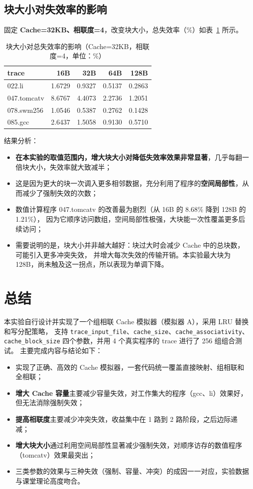 \documentclass[12pt,a4paper]{ctexart}
\begin{document}
\subsection{块大小对失效率的影响}
固定 \textbf{Cache=32KB、相联度=4}，改变块大小，总失效率（\%）如表~\ref{tab:block} 所示。
\begin{table}[H]
\centering
\caption{块大小对总失效率的影响（Cache=32KB，相联度=4，单位：\%）}
\label{tab:block}
\begin{tabular}{lrrrr}
\toprule
trace & 16B & 32B & 64B & 128B \\
\midrule
022.li      & 1.6729 & 0.9327 & 0.5137 & 0.2863 \\
047.tomcatv & 8.6767 & 4.4073 & 2.2736 & 1.2051 \\
078.swm256  & 1.0546 & 0.5387 & 0.2762 & 0.1428 \\
085.gcc     & 2.6437 & 1.5058 & 0.9130 & 0.5710 \\
\bottomrule
\end{tabular}
\end{table}
结果分析：
\begin{itemize}
  \item \textbf{在本实验的取值范围内，增大块大小对降低失效率效果非常显著}，几乎每翻一倍块大小，失效率就大致减半；
  \item 这是因为更大的块一次调入更多相邻数据，充分利用了程序的\textbf{空间局部性}，从而减少了强制失效的次数；
  \item 数值计算程序 047.tomcatv 的改善最为剧烈（从 16B 的 8.68\% 降到 128B 的 1.21\%），
        因为它顺序访问数组，空间局部性极强，大块能一次性覆盖更多后续访问；
  \item 需要说明的是，块大小并非越大越好：块过大时会减少 Cache 中的总块数，可能引入更多冲突失效，
        并增大每次失效的传输开销。本实验最大块为 128B，尚未触及这一拐点，所以表现为单调下降。
\end{itemize}

\section{总结}
本实验自行设计并实现了一个组相联 Cache 模拟器（模拟器 A），采用 LRU 替换和写分配策略，
支持 \texttt{trace\_input\_file}、\texttt{cache\_size}、\texttt{cache\_associativity}、
\texttt{cache\_block\_size} 四个参数，并用 4 个真实程序的 trace 进行了 256 组组合测试。
主要完成内容与结论如下：
\begin{itemize}
  \item 实现了正确、高效的 Cache 模拟器，一套代码统一覆盖直接映射、组相联和全相联；
  \item \textbf{增大 Cache 容量}主要减少容量失效，对工作集大的程序（gcc、li）效果好，
        但无法消除强制失效；
  \item \textbf{提高相联度}主要减少冲突失效，收益集中在 1 路到 2 路阶段，之后边际递减；
  \item \textbf{增大块大小}通过利用空间局部性显著减少强制失效，对顺序访存的数值程序（tomcatv）效果最突出；
  \item 三类参数的效果与三种失效（强制、容量、冲突）的成因一一对应，实验数据与课堂理论高度吻合。
\end{itemize}
\end{document}
